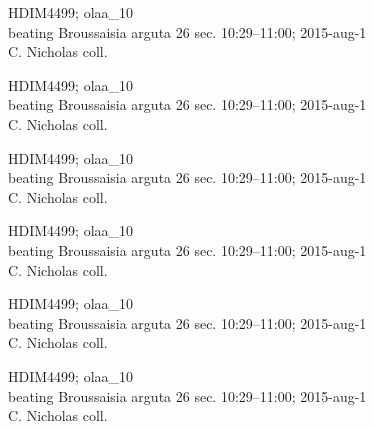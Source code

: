 \documentclass[2pt]{extarticle}
\begin{document}
\noindent
\parbox{0.16\textwidth}{\tiny \raggedright \rule[-0.3\baselineskip]{0pt}{10pt}HDIM4499; olaa\_10\\ beating Broussaisia arguta 26 sec. 10:29--11:00; 2015-aug-1\\ C. Nicholas coll.}
\parbox{0.16\textwidth}{\tiny \raggedright \rule[-0.3\baselineskip]{0pt}{10pt}HDIM4499; olaa\_10\\ beating Broussaisia arguta 26 sec. 10:29--11:00; 2015-aug-1\\ C. Nicholas coll.}
\parbox{0.16\textwidth}{\tiny \raggedright \rule[-0.3\baselineskip]{0pt}{10pt}HDIM4499; olaa\_10\\ beating Broussaisia arguta 26 sec. 10:29--11:00; 2015-aug-1\\ C. Nicholas coll.}
\parbox{0.16\textwidth}{\tiny \raggedright \rule[-0.3\baselineskip]{0pt}{10pt}HDIM4499; olaa\_10\\ beating Broussaisia arguta 26 sec. 10:29--11:00; 2015-aug-1\\ C. Nicholas coll.}
\parbox{0.16\textwidth}{\tiny \raggedright \rule[-0.3\baselineskip]{0pt}{10pt}HDIM4499; olaa\_10\\ beating Broussaisia arguta 26 sec. 10:29--11:00; 2015-aug-1\\ C. Nicholas coll.}
\parbox{0.16\textwidth}{\tiny \raggedright \rule[-0.3\baselineskip]{0pt}{10pt}HDIM4499; olaa\_10\\ beating Broussaisia arguta 26 sec. 10:29--11:00; 2015-aug-1\\ C. Nicholas coll.} \\ 
\vspace{0.001in} 
\end{document}
